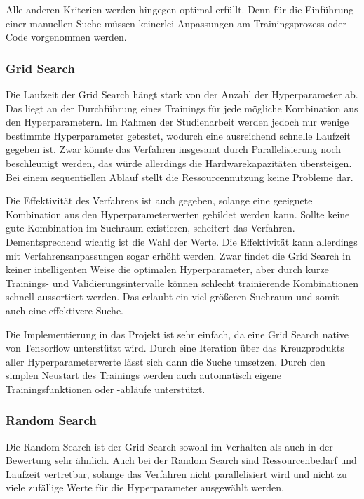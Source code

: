 Alle anderen Kriterien werden hingegen optimal erfüllt.
Denn für die Einführung einer manuellen Suche müssen keinerlei Anpassungen am Trainingsprozess oder Code vorgenommen werden.

\subsubsection{Grid Search}
Die Laufzeit der Grid Search hängt stark von der Anzahl der Hyperparameter ab.
Das liegt an der Durchführung eines Trainings für jede mögliche Kombination aus den Hyperparametern.
Im Rahmen der Studienarbeit werden jedoch nur wenige bestimmte Hyperparameter getestet, wodurch eine ausreichend schnelle Laufzeit gegeben ist.
Zwar könnte das Verfahren insgesamt durch Parallelisierung noch beschleunigt werden, das würde allerdings die Hardwarekapazitäten übersteigen.
Bei einem sequentiellen Ablauf stellt die Ressourcennutzung keine Probleme dar.
\newline

Die Effektivität des Verfahrens ist auch gegeben, solange eine geeignete Kombination aus den Hyperparameterwerten gebildet werden kann.
Sollte keine gute Kombination im Suchraum existieren, scheitert das Verfahren.
Dementsprechend wichtig ist die Wahl der Werte.
Die Effektivität kann allerdings mit Verfahrensanpassungen sogar erhöht werden.
Zwar findet die Grid Search in keiner intelligenten Weise die optimalen Hyperparameter, aber durch kurze Trainings- und Validierungsintervalle können schlecht trainierende Kombinationen schnell aussortiert werden.
Das erlaubt ein viel größeren Suchraum und somit auch eine effektivere Suche.
\newline

Die Implementierung in das Projekt ist sehr einfach, da eine Grid Search native von Tensorflow unterstützt wird.
Durch eine Iteration über das Kreuzprodukts aller Hyperparameterwerte lässt sich dann die Suche umsetzen.
Durch den simplen Neustart des Trainings werden auch automatisch eigene Trainingsfunktionen oder -abläufe unterstützt.

\subsubsection{Random Search}
Die Random Search ist der Grid Search sowohl im Verhalten als auch in der Bewertung sehr ähnlich.
Auch bei der Random Search sind Ressourcenbedarf und Laufzeit vertretbar, solange das Verfahren nicht parallelisiert wird und nicht zu viele zufällige Werte für die Hyperparameter ausgewählt werden.
\newline

